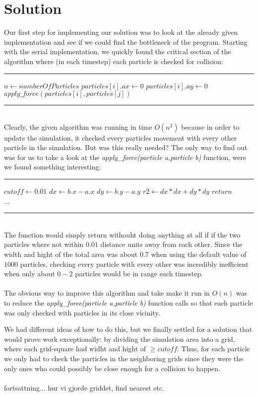\documentclass[11pt,a4paper]{article}
\begin{document}
\section{Solution}
Our first step for implementing our solution was to look at the already given implementation and see if we could find the bottleneck of the program. Starting with the serial implementation, we quickly found the critical section of the algorithm where (in each timestep) each particle is checked for collision:
\\
\rule{125mm}{0.1pt}
\begin{algorithmic}
\STATE $n \gets numberOfParticles$
	\STATE $particles[i].ax \gets 0$
	\STATE $particles[i].ay \gets 0$
			\STATE $apply\_force(particles[i],particles[j])$
	\ENDFOR
\ENDFOR 
\end{algorithmic}
\rule{125mm}{0.1pt}
\vspace{10pt}
\\
Clearly, the given algorithm was running in time $O(n^{2})$ because in order to update the simulation, it checked every particles movement with every other particle in the simulation. But was this really needed? The only way to find out was for us to take a look at the \emph{apply\_force(particle a,particle b)} function, were we found something interesting:
\\
\rule{125mm}{0.1pt}
\begin{algorithmic}
\STATE $cutoff \gets 0.01$
\STATE $dx \gets b.x - a.x$
\STATE $dy \gets b.y - a.y$
\STATE $r2 \gets dx*dx + dy*dy$
	\STATE $return$
\ENDIF
\\
...
\end{algorithmic}
\rule{125mm}{0.1pt}
\vspace{10pt}
\\
The function would simply return withouht doing anything at all if if the two particles where not within $0.01$ distance units away from each other. Since the width and hight of the total area was about $0.7$ when using the default value of $1000$ particles, checking every particle with every other was incredibly inefficient when only about $0-2$ particles would be in range each timestep.
\\
\\
The obvious way to improve this algorithm and take make it run in $O(n)$ was to reduce the \emph{apply\_force(particle a,particle b)} function calls so that each particle was only checked with particles in its close vicinity.

We had different ideas of how to do this, but we finally settled for a solution that would prove work exceptionally: by dividing the simulation area into a grid, where each grid-square had widht and hight of $\geq cutoff$. Thus, for each particle we only had to check the particles in the neighboring grids since they were the only ones who could possibly be close enough for a collision to happen.
\\
\\
fortsattning... hur vi gjorde griddet, find nearest etc.
\end{document}
